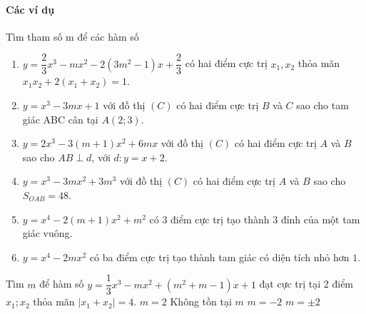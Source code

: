 \paragraph{Các ví dụ}
\begin{vd}%
Tìm tham số m để các hàm số
\begin{enumerate}
	\item $y=\dfrac{2}{3}x^3-mx^2-2(3m^2-1)x+\dfrac{2}{3}$ có hai điểm cực trị $x_1, x_2$ thỏa mãn $x_1x_2+2(x_1+x_2)=1$.
	\item $y=x^3-3mx+1$ với đồ thị $(C)$ có hai điểm cực trị $B$ và $C$ sao cho tam giác ABC cân tại $A(2;3)$.
	\item $y=2x^3-3(m+1)x^2+6mx$ với đồ thị $(C)$ có hai điểm cực trị $A$ và $B$ sao cho $AB\perp d$, với $d\colon y=x+2$.
	\item $y=x^3-3mx^2+3m^3$ với đồ thị $(C)$ có hai điểm cực trị $A$ và $B$ sao cho $S_{OAB}=48$.
	\item $y=x^4-2(m+1)x^2+m^2$ có $3$ điểm cực trị tạo thành $3$ đỉnh của một tam giác vuông.
	\item $y=x^4-2mx^2$ có ba điểm cực trị tạo thành tam giác có diện tích nhỏ hơn $1$.
\end{enumerate}
\end{vd}
\begin{vd}%
Tìm $m$ để hàm số $y=\dfrac{1}{3}x^3-mx^2+\left(m^2+m-1\right)x+1$ đạt cực trị tại 2 điểm $x_1; x_2$ thỏa mãn $|x_1+x_2|=4$. 
\choice
{$m=2$}
{Không tồn tại $m$}
{\True $m=-2$}
{$m=\pm 2$}
\end{vd}

